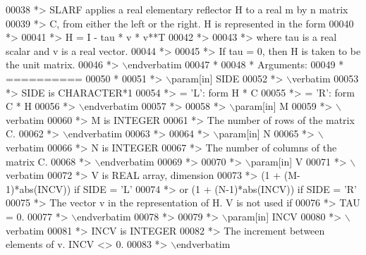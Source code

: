 \begin{DoxyCode}
00038 \textcolor{comment}{*> SLARF applies a real elementary reflector H to a real m by n matrix}
00039 \textcolor{comment}{*> C, from either the left or the right. H is represented in the form}
00040 \textcolor{comment}{*>}
00041 \textcolor{comment}{*>       H = I - tau * v * v**T}
00042 \textcolor{comment}{*>}
00043 \textcolor{comment}{*> where tau is a real scalar and v is a real vector.}
00044 \textcolor{comment}{*>}
00045 \textcolor{comment}{*> If tau = 0, then H is taken to be the unit matrix.}
00046 \textcolor{comment}{*> \(\backslash\)endverbatim}
00047 \textcolor{comment}{*}
00048 \textcolor{comment}{*  Arguments:}
00049 \textcolor{comment}{*  ==========}
00050 \textcolor{comment}{*}
00051 \textcolor{comment}{*> \(\backslash\)param[in] SIDE}
00052 \textcolor{comment}{*> \(\backslash\)verbatim}
00053 \textcolor{comment}{*>          SIDE is CHARACTER*1}
00054 \textcolor{comment}{*>          = 'L': form  H * C}
00055 \textcolor{comment}{*>          = 'R': form  C * H}
00056 \textcolor{comment}{*> \(\backslash\)endverbatim}
00057 \textcolor{comment}{*>}
00058 \textcolor{comment}{*> \(\backslash\)param[in] M}
00059 \textcolor{comment}{*> \(\backslash\)verbatim}
00060 \textcolor{comment}{*>          M is INTEGER}
00061 \textcolor{comment}{*>          The number of rows of the matrix C.}
00062 \textcolor{comment}{*> \(\backslash\)endverbatim}
00063 \textcolor{comment}{*>}
00064 \textcolor{comment}{*> \(\backslash\)param[in] N}
00065 \textcolor{comment}{*> \(\backslash\)verbatim}
00066 \textcolor{comment}{*>          N is INTEGER}
00067 \textcolor{comment}{*>          The number of columns of the matrix C.}
00068 \textcolor{comment}{*> \(\backslash\)endverbatim}
00069 \textcolor{comment}{*>}
00070 \textcolor{comment}{*> \(\backslash\)param[in] V}
00071 \textcolor{comment}{*> \(\backslash\)verbatim}
00072 \textcolor{comment}{*>          V is REAL array, dimension}
00073 \textcolor{comment}{*>                     (1 + (M-1)*abs(INCV)) if SIDE = 'L'}
00074 \textcolor{comment}{*>                  or (1 + (N-1)*abs(INCV)) if SIDE = 'R'}
00075 \textcolor{comment}{*>          The vector v in the representation of H. V is not used if}
00076 \textcolor{comment}{*>          TAU = 0.}
00077 \textcolor{comment}{*> \(\backslash\)endverbatim}
00078 \textcolor{comment}{*>}
00079 \textcolor{comment}{*> \(\backslash\)param[in] INCV}
00080 \textcolor{comment}{*> \(\backslash\)verbatim}
00081 \textcolor{comment}{*>          INCV is INTEGER}
00082 \textcolor{comment}{*>          The increment between elements of v. INCV <> 0.}
00083 \textcolor{comment}{*> \(\backslash\)endverbatim}

\end{DoxyCode}

